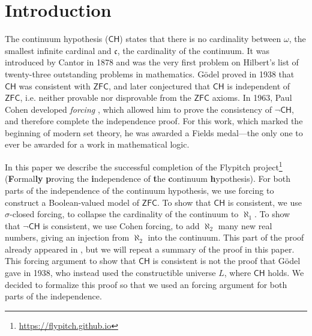 \documentclass[sigplan,10pt,review, anonymous]{acmart}
\theoremstyle{definition}
\begin{document}
\section{Introduction}
\label{section:intro}
The continuum hypothesis ($\mathsf{CH}$) states that there is no cardinality between $\omega$, the smallest infinite cardinal and $\mathfrak{c}$, the cardinality of the continuum.
It was introduced by Cantor \cite{cantor1878beitrag} in 1878 and was the very first problem on Hilbert's list of twenty-three outstanding problems in mathematics.
G\"odel \cite{godel1938consistency} proved in 1938 that $\mathsf{CH}$ was consistent with $\mathsf{ZFC}$, and later conjectured that $\mathsf{CH}$ is independent of $\mathsf{ZFC}$, i.e. neither provable nor disprovable from the $\mathsf{ZFC}$ axioms.
In 1963, Paul Cohen developed \emph{forcing} \cite{cohen-the-independence-of-the-continuum-hypothesis-1,cohen1964independence2}, which allowed him to prove the consistency of $\neg \mathsf{CH}$, and therefore complete the independence proof.
For this work, which marked the beginning of modern set theory, he was awarded a Fields medal---the only one to ever be awarded for a work in mathematical logic.

In this paper we describe the successful completion of the Flypitch project\footnote{\url{https://flypitch.github.io}} (\textbf{F}ormal\textbf{ly} \textbf{p}roving the \textbf{i}ndependence of \textbf{t}he \textbf{c}ontinuum \textbf{h}ypothesis).
For both parts of the independence of the continuum hypothesis, we use forcing to construct a Boolean-valued model of $\mathsf{ZFC}$.
To show that $\mathsf{CH}$ is consistent, we use $\sigma$-closed forcing, to collapse the cardinality of the continuum to $\aleph_1$.
To show that $\neg \mathsf{CH}$ is consistent, we use Cohen forcing, to add $\aleph_2$ many new real numbers, giving an injection from $\aleph_2$ into the continuum.
This part of the proof already appeared in \cite{DBLP:conf/itp/HanD19}, but we will repeat a summary of the proof in this paper.
This forcing argument to show that $\mathsf{CH}$ is consistent is not the proof that G\"odel gave in 1938, who instead used the constructible universe $L$, where $\mathsf{CH}$ holds. We decided to formalize this proof so that we used an forcing argument for both parts of the independence.
\end{document}
